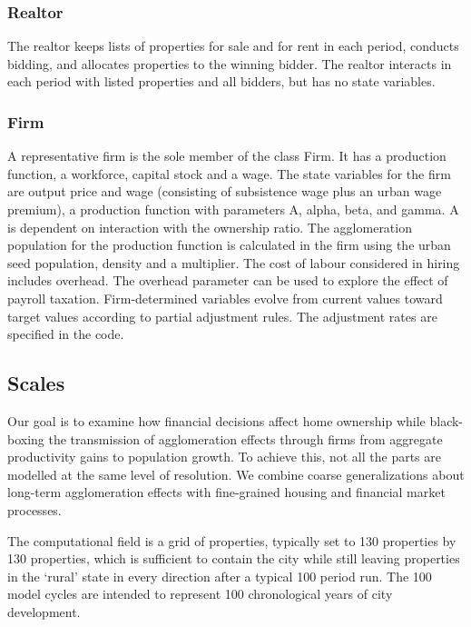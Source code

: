 \subsubsection{Realtor}
The realtor keeps lists of properties for sale and for rent in each period, conducts bidding, and allocates properties to the winning bidder. The realtor interacts in each period with listed properties and  all bidders, but has no state variables.


\subsubsection{Firm}
A representative firm is the sole member of the class Firm. It has a production function, a workforce, capital stock and a wage. 
The state variables for the firm are output price and wage (consisting of subsistence wage plus an urban wage premium), a production function with parameters  A, alpha, beta, and gamma. A is dependent on interaction with the ownership ratio. The agglomeration population for the production function is calculated in the firm using the urban seed population, density and a multiplier. The cost of labour considered in hiring includes overhead. The overhead parameter can be used to explore the effect of payroll taxation. 
Firm-determined variables evolve from current values toward target values according to partial adjustment rules. The adjustment rates are specified in the code.  

                
\subsection{Scales}
Our goal is to examine %
how financial decisions affect home ownership while black-boxing the transmission of agglomeration effects through firms from aggregate productivity gains to population growth.  To achieve this, not all the parts are modelled at the same level of resolution. We combine coarse generalizations about long-term agglomeration effects with fine-grained housing and financial market processes. 

The computational field is a grid of properties, typically set to 130 properties by 130 properties, which is sufficient to contain the city while still leaving properties in the `rural' state in every direction after a typical 100 period run. The 100 model cycles are intended to represent 100 chronological years of city development. %

